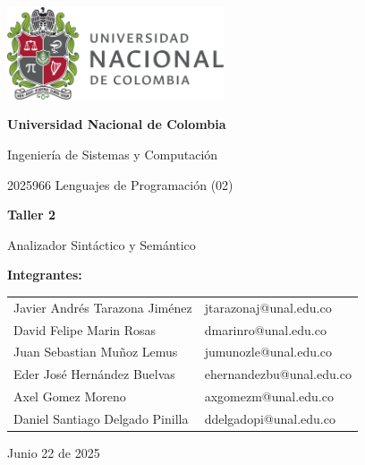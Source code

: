 \documentclass{article}
\begin{document}
\begin{titlepage}
  \centering
  \includegraphics[width=0.48\textwidth]{logo_universidad.png}
  \par\vspace{2cm}

  {\Large \textbf{Universidad Nacional de Colombia} \par}
  \vspace{0.5cm}
  {\large Ingeniería de Sistemas y Computación \par}
  {\large 2025966 Lenguajes de Programación (02)\par}
  \vspace{3cm}

  {\large \textbf{Taller 2} \par}
  {\large Analizador Sintáctico y Semántico\par}
  \vspace{3cm}

  {\large \textbf{Integrantes:} \par}
  \vspace{0.5cm}
  \begin{tabular}{ll}
    Javier Andrés Tarazona Jiménez   & jtarazonaj@unal.edu.co \\
    David Felipe Marin Rosas         & dmarinro@unal.edu.co   \\
    Juan Sebastian Muñoz Lemus       & jumunozle@unal.edu.co          \\
    Eder José Hernández Buelvas      & ehernandezbu@unal.edu.co          \\
    Axel Gomez Moreno                & axgomezm@unal.edu.co          \\
    Daniel Santiago Delgado Pinilla  & ddelgadopi@unal.edu.co          \\
  \end{tabular}
  \par\vspace{3cm}

  {\large Junio 22 de 2025 \par}
\end{titlepage}
\end{document}
